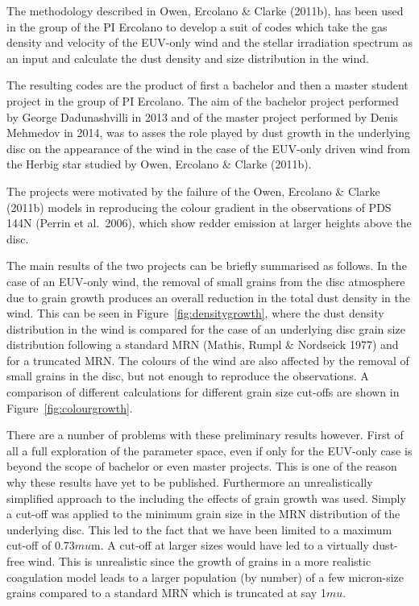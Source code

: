 \documentclass[10pt,fleqn,twoside]{article}
\begin{document}
The methodology described in Owen, Ercolano \& Clarke (2011b), has been
used in the group of the PI Ercolano to develop a suit of codes which
take the gas density and velocity of the EUV-only wind and the stellar
irradiation spectrum as an input and calculate the dust density and
size distribution in the wind. 

The resulting codes are the product of first a bachelor and then a master
student project in the group of PI Ercolano. The aim of the bachelor project
performed by George Dadunashvilli in 2013 and of the master project
performed  by Denis Mehmedov in 2014, was to asses the role played by
dust growth in the underlying disc on the appearance of the wind in
the case of the EUV-only driven wind from the Herbig star studied by
Owen, Ercolano \& Clarke (2011b). 

The projects were motivated by the failure of the Owen, Ercolano \&
Clarke (2011b) models in reproducing the colour gradient in the observations
of  PDS 144N (Perrin et al.\ 2006), which show redder emission at
larger heights above the disc. 

The main results of the two projects can be briefly summarised as follows. 
In the case of an EUV-only wind, the removal of small grains from the disc atmosphere due to grain
growth produces an overall reduction in the total dust density in the
wind. This can be seen in Figure~\ref{fig:densitygrowth}, where the
dust density distribution in the wind is compared for the case of an
underlying disc grain size distribution following a 
standard MRN (Mathis, Rumpl \& Nordseick 1977) and for a truncated 
MRN. The colours of the wind are also affected by the removal of small
grains in the disc, but not enough to reproduce the observations. A
comparison of different calculations for different grain size cut-offs
are shown in Figure~\ref{fig:colourgrowth}. 

There are a number of problems with these preliminary results
however. First of all
a full exploration of the parameter space, even if only for the
EUV-only case is beyond the scope of bachelor or even master
projects. This is one of the reason why these results have yet to be 
published. Furthermore an unrealistically simplified approach to the 
including the effects of grain growth was used. Simply a cut-off was
applied to the minimum grain size in the MRN distribution of the
underlying disc. This led to the fact that we have been limited to a
maximum cut-off of 0.73$mu$m. A cut-off at larger sizes would have led
to a virtually dust-free wind. This is unrealistic since the growth of
grains in a more realistic coagulation model leads to a larger population (by
number) of a few micron-size grains compared to a standard MRN which
is truncated at say 1$mu$. 
\end{document}

